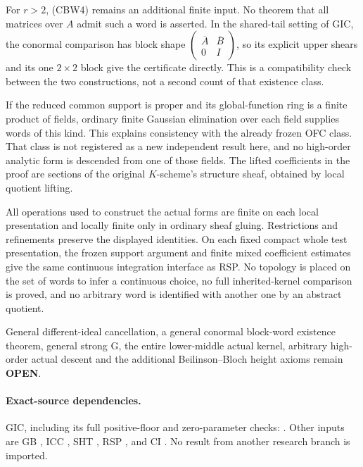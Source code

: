 For $r>2$, (CBW4) remains an additional finite input.  No theorem
that all matrices over $A$ admit such a word is asserted.  In the
shared-tail setting of GIC, the conormal comparison has block shape
$\left(\begin{smallmatrix}\overline A&\overline B\\0&I\end{smallmatrix}\right)$,
so its explicit upper shears and its one $2\times2$ block give
the certificate directly.  This is a compatibility check between
the two constructions, not a second count of that existence class.

If the reduced common support is proper and its global-function
ring is a finite product of fields, ordinary finite Gaussian
elimination over each field supplies words of this kind.  This
explains consistency with the already frozen OFC class.  That
class is not registered as a new independent result here, and no
high-order analytic form is descended from one of those fields.
The lifted coefficients in the proof are sections of the original
$K$-scheme's structure sheaf, obtained by local quotient lifting.

All operations used to construct the actual forms are finite on
each local presentation and locally finite only in ordinary sheaf
gluing.  Restrictions and refinements preserve the displayed
identities.  On each fixed compact whole test presentation, the
frozen support argument and finite mixed coefficient estimates
give the same continuous integration interface as RSP.  No
topology is placed on the set of words to infer a continuous
choice, no full inherited-kernel comparison is proved, and no
arbitrary word is identified with another one by an abstract
quotient.

General different-ideal cancellation, a general conormal block-word
existence theorem, general strong G, the entire lower-middle actual
kernel, arbitrary high-order actual descent and the additional
Beilinson--Bloch height axioms remain \textbf{OPEN}.

\paragraph{Exact-source dependencies.}
GIC, including its full positive-floor and zero-parameter checks:
.
Other inputs are
GB ,
ICC ,
SHT ,
RSP ,
and CI .
No result from another research branch is imported.

